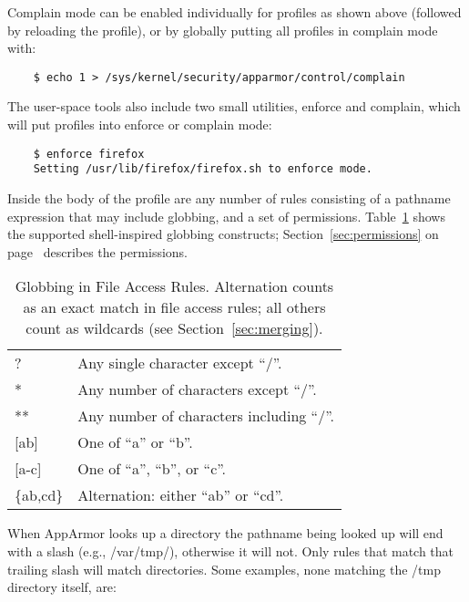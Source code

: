 \documentclass[a4paper]{article}
\begin{document}
Complain mode can be enabled individually for profiles as shown above
(followed by reloading the profile), or by globally putting all profiles
in complain mode with:

\begin{small}
\begin{verbatim}
    $ echo 1 > /sys/kernel/security/apparmor/control/complain
\end{verbatim}
\end{small}

The user-space tools also include two small utilities, enforce and
complain, which will put profiles into enforce or complain mode:

\begin{small}
\begin{verbatim}
    $ enforce firefox
    Setting /usr/lib/firefox/firefox.sh to enforce mode.
\end{verbatim}
\end{small}

Inside the body of the profile are any number of rules consisting of a
pathname expression that may include globbing, and a set of permissions.
Table~\ref{tab:globbing} shows the supported shell-inspired globbing
constructs; Section~\ref{sec:permissions} on
page~\pageref{sec:permissions} describes the permissions.

\begin{table}[tb]
\center
\begin{tabular}{|l|l|}
\hline
{?}		&	Any single character except ``/''.		\\
{*}		&	Any number of characters except ``/''.		\\
{**}		&	Any number of characters including ``/''.	\\
{[ab]}		&	One of ``a'' or ``b''.				\\
{[a-c]}		&	One of ``a'', ``b'', or ``c''.			\\
\{ab,cd\}	&	Alternation: either ``ab'' or ``cd''.		\\
\hline
\end{tabular}
\caption{Globbing in File Access Rules. Alternation counts as an exact
match in file access rules; all others count as wildcards (see
Section~\ref{sec:merging}).}
\label{tab:globbing}
\end{table}

When AppArmor looks up a directory the pathname being looked up will end
with a slash (e.g., /var/tmp/), otherwise it will not.  Only rules
that match that trailing slash will match directories.  Some examples,
none matching the /tmp directory itself, are:
\end{document}
